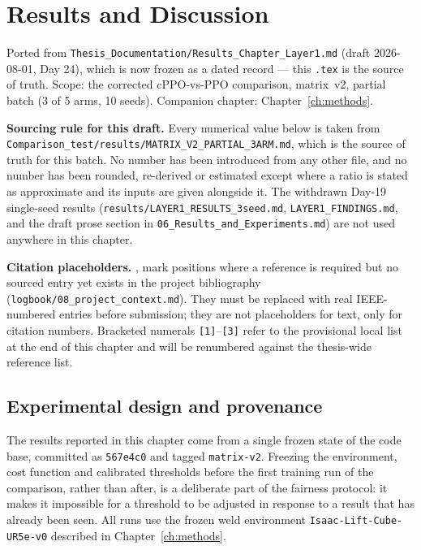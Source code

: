 \chapter{Results and Discussion}\label{ch:results}

\begin{draftnote}
Ported from \texttt{Thesis\_Documentation/Results\_Chapter\_Layer1.md} (draft 2026-08-01, Day 24),
which is now frozen as a dated record --- this \texttt{.tex} is the source of truth. Scope: the
corrected cPPO-vs-PPO comparison, matrix~v2, partial batch (3 of 5 arms, 10 seeds). Companion
chapter: Chapter~\ref{ch:methods}.

\textbf{Sourcing rule for this draft.} Every numerical value below is taken from
\texttt{Comparison\_test/results/MATRIX\_V2\_PARTIAL\_3ARM.md}, which is the source of truth for this
batch. No number has been introduced from any other file, and no number has been rounded,
re-derived or estimated except where a ratio is stated as approximate and its inputs are given
alongside it. The withdrawn Day-19 single-seed results
(\texttt{results/LAYER1\_RESULTS\_3seed.md}, \texttt{LAYER1\_FINDINGS.md}, and the draft prose section in
\texttt{06\_Results\_and\_Experiments.md}) are not used anywhere in this chapter.

\textbf{Citation placeholders.} ,  mark positions where a reference is required
but no sourced entry yet exists in the project bibliography (\texttt{logbook/08\_project\_context.md}).
They must be replaced with real IEEE-numbered entries before submission; they are not
placeholders for text, only for citation numbers. Bracketed numerals \texttt{{[}1{]}}--\texttt{{[}3{]}} refer to the
provisional local list at the end of this chapter and will be renumbered against the thesis-wide
reference list.
\end{draftnote}

\section{Experimental design and provenance}\label{sec:r-design}

The results reported in this chapter come from a single frozen state of the code base, committed
as \texttt{567e4c0} and tagged \texttt{matrix-v2}. Freezing the environment, cost function and calibrated
thresholds before the first training run of the comparison, rather than after, is a deliberate
part of the fairness protocol: it makes it impossible for a threshold to be adjusted in response
to a result that has already been seen. All runs use the frozen weld environment
\texttt{Isaac-Lift-Cube-UR5e-v0} described in Chapter~\ref{ch:methods}.

